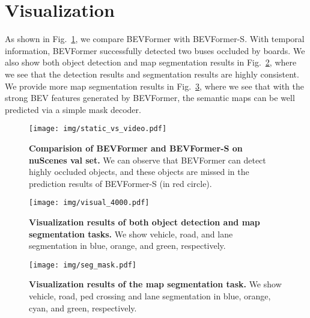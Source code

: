 \documentclass{article}
\begin{document}
\section{Visualization}

As shown in Fig.~\ref{fig:static_vs_video},  we compare BEVFormer with BEVFormer-S. With temporal information, BEVFormer successfully detected two buses occluded by  boards. We also show both object detection and map segmentation results in Fig.~\ref{fig:visual_4000}, where we see that the detection results and segmentation results are highly consistent. We provide more map segmentation results in Fig.~\ref{fig:mask}, where we see that with the strong BEV features generated by BEVFormer, the semantic maps can be well predicted via a simple mask decoder.
\vspace{16mm}
\begin{figure}[h]
\centering
\texttt{[image: img/static\_vs\_video.pdf]}
\caption{\textbf{Comparision of BEVFormer and BEVFormer-S on nuScenes val set.} We can observe that BEVFormer can detect highly occluded objects, and these objects are missed in the  prediction results of BEVFormer-S (in red circle). 
}
\label{fig:static_vs_video}
\end{figure}


\begin{figure}[b]
\centering
\texttt{[image: img/visual\_4000.pdf]}
\caption{\textbf{Visualization results of both object detection and map segmentation tasks.} We show vehicle, road, and lane segmentation in blue, orange, and green, respectively. 
}
\label{fig:visual_4000}
\end{figure}


\begin{figure}[h]
\centering
\texttt{[image: img/seg\_mask.pdf]}
\caption{\textbf{Visualization results of the map segmentation task.} We show vehicle, road, ped crossing and lane segmentation in blue, orange,  cyan, and green, respectively. 
}
\label{fig:mask}
\end{figure}
\end{document}
